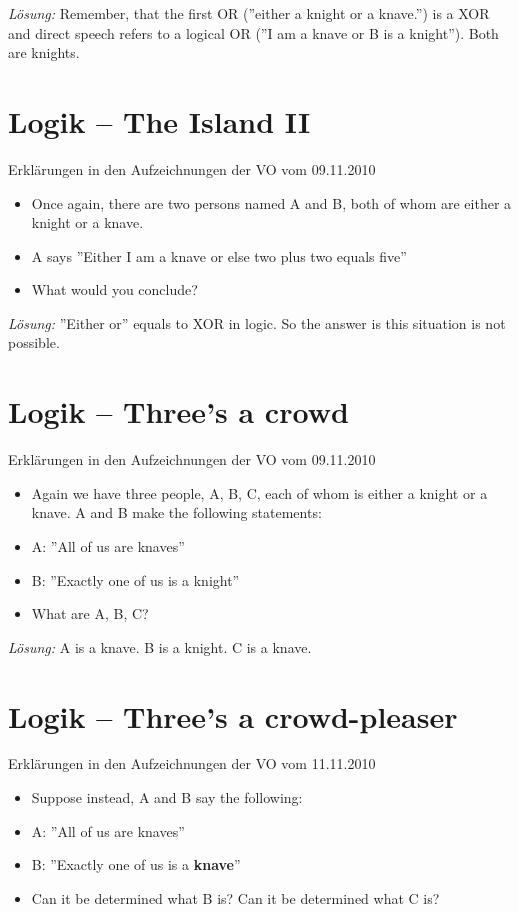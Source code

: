 \documentclass[11pt,a4paper]{article}
\theoremstyle{area}
\begin{document}
\emph{Lösung:} Remember, that the first OR (''either a
    knight or a knave.'') is a XOR and direct speech refers to a
    logical OR (''I am a knave or B is a knight''). Both are knights.

\section{Logik -- The Island II}

Erklärungen in den Aufzeichnungen der VO vom 09.11.2010

\begin{itemize}
  \item Once again, there are two persons named A and B, both of whom are
    either a knight or a knave.
  \item A says ''Either I am a knave or else two plus two equals five''
  \item What would you conclude?
\end{itemize}

\emph{Lösung:} ''Either or'' equals to XOR in logic. So the answer is
    this situation is not possible.

\section{Logik -- Three's a crowd}

Erklärungen in den Aufzeichnungen der VO vom 09.11.2010

\begin{itemize}
  \item Again we have three people, A, B, C, each of whom is either a
    knight or a knave. A and B make the following statements:
  \item A: ''All of us are knaves''
  \item B: ''Exactly one of us is a knight''
  \item What are A, B, C?
\end{itemize}

\emph{Lösung:} A is a knave. B is a knight. C is a knave.

\section{Logik -- Three's a crowd-pleaser}

Erklärungen in den Aufzeichnungen der VO vom 11.11.2010

\begin{itemize}
  \item Suppose instead, A and B say the following:
  \item A: ''All of us are knaves''
  \item B: ''Exactly one of us is a \textbf{knave}''
  \item Can it be determined what B is?
    Can it be determined what C is?
\end{itemize}
\end{document}
